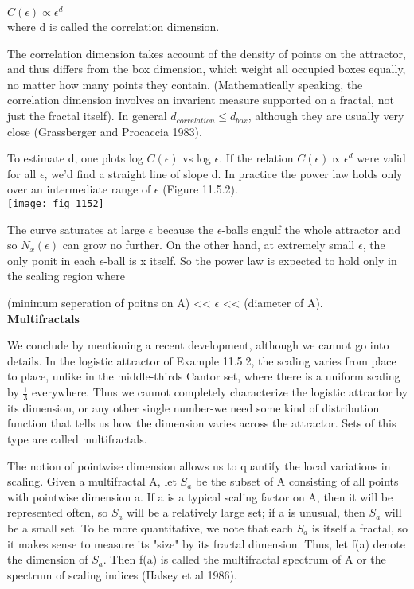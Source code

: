 \documentclass{article}
\newcommand\tab[1][1cm]{\hspace*{#1}}
\begin{document}
$C(\epsilon) \propto \epsilon^{d}$ \\
where d is called the correlation dimension. \\ \tab

The correlation dimension takes account of the density of points on the attractor, and thus differs from the box dimension, which weight all occupied boxes equally, no matter how many points they contain. (Mathematically speaking, the correlation dimension involves an invarient measure supported on a fractal, not just the fractal itself). In general $d_{correlation} \leq d_{box}$, although they are usually very close (Grassberger and Procaccia 1983). \\ \tab

To estimate d, one plots log $C(\epsilon)$ vs log $\epsilon$. If the relation $C(\epsilon) \propto \epsilon^{d}$ were valid for all $\epsilon$, we'd find a straight line of slope d. In practice the power law holds only over an intermediate range of $\epsilon$ (Figure 11.5.2). \\

\texttt{[image: fig\_1152]}

The curve saturates at large $\epsilon$ because the $\epsilon$-balls engulf the whole attractor and so $N_{x}(\epsilon)$ can grow no further. On the other hand, at extremely small $\epsilon$, the only ponit in each $\epsilon$-ball is x itself. So the power law is expected to hold only in the scaling region where \\ \tab \tab

(minimum seperation of poitns on A) << $\epsilon$ << (diameter of A). \\

\textbf {Multifractals} \\ \tab

We conclude by mentioning a recent development, although we cannot go into details. In the logistic attractor of Example 11.5.2, the scaling varies from place to place, unlike in the middle-thirds Cantor set, where there is a uniform scaling by $\frac{1}{3}$ everywhere. Thus we cannot completely characterize the logistic attractor by its dimension, or any other single number-we need some kind of distribution function that tells us how the dimension varies across the attractor. Sets of this type are called multifractals. \\ \tab

The notion of pointwise dimension allows us to quantify the local variations in scaling. Given a multifractal A, let $S_{a}$ be the subset of A consisting of all points with pointwise dimension a. If a is a typical scaling factor on A, then it will be represented often, so $S_{a}$ will be a relatively large set; if a is unusual, then $S_{a}$ will be a small set. To be more quantitative, we note that each $S_{a}$ is itself a fractal, so it makes sense to measure its "size" by its fractal dimension. Thus, let f(a) denote the dimension of $S_{a}$. Then f(a) is called the multifractal spectrum of A or the spectrum of scaling indices (Halsey et al 1986). \\ \tab
\end{document}
